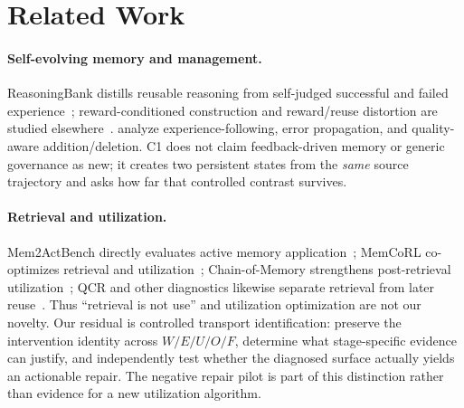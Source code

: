 \section{Related Work}
\paragraph{Self-evolving memory and management.} ReasoningBank distills reusable reasoning from self-judged successful and failed experience~\citep{ouyang2026reasoningbank}; reward-conditioned construction and reward/reuse distortion are studied elsewhere~\citep{wang2025memalpha,asadolahi2026inflation,yang2026romerl}. \citet{xiong2026memorymanagement} analyze experience-following, error propagation, and quality-aware addition/deletion. C1 does not claim feedback-driven memory or generic governance as new; it creates two persistent states from the \emph{same} source trajectory and asks how far that controlled contrast survives.

\paragraph{Retrieval and utilization.} Mem2ActBench directly evaluates active memory application~\citep{shen2026mem2actbench}; MemCoRL co-optimizes retrieval and utilization~\citep{liu2026memcorl}; Chain-of-Memory strengthens post-retrieval utilization~\citep{xu2026chainofmemory}; QCR and other diagnostics likewise separate retrieval from later reuse~\citep{li2026qcr,yuan2026retrievalutilization}. Thus ``retrieval is not use'' and utilization optimization are not our novelty. Our residual is controlled transport identification: preserve the intervention identity across $W/E/U/O/F$, determine what stage-specific evidence can justify, and independently test whether the diagnosed surface actually yields an actionable repair. The negative repair pilot is part of this distinction rather than evidence for a new utilization algorithm.
